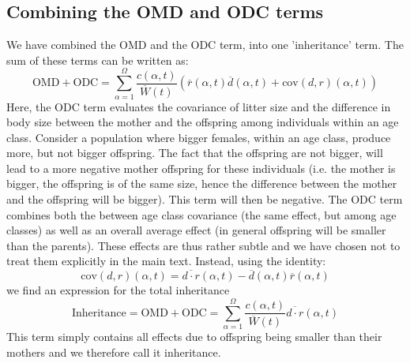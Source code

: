 \subsection{Combining the OMD and ODC terms}\label{app:ape:inh}
We have combined the OMD and the ODC term, into one 'inheritance' term. The sum of these terms can be written as:
\begin{equation}
\text{OMD} + \text{ODC} = 
\sum_{\alpha=1}^\Omega 
\frac{c(\alpha,t)}{\overline{W}(t)} 
\left(
\overline{r}(\alpha,t)\overline{d}(\alpha,t)
+ 
\mathrm{cov}(d,r)(\alpha,t) 
\right) 
\end{equation}
Here, the ODC term evaluates the covariance of litter size and the difference in body size between the mother and the offspring among individuals within an age class. Consider a population where bigger females, within an age class, produce more, but not bigger offspring. The fact that the offspring are not bigger, will lead to a more negative mother offspring for these individuals (i.e. the mother is bigger, the offspring is of the same size, hence the difference between the mother and the offspring will be bigger). This term will then be negative. The ODC term combines both the between age class covariance (the same effect, but among age classes) as well as an overall average effect (in general offspring will be smaller than the parents). These effects are thus rather subtle and we have chosen not to treat them explicitly in the main text. Instead, using the identity:
\begin{equation}
\mathrm{cov}(d,r)(\alpha,t) = \overline{d\cdot r}(\alpha,t) - \overline{d}(\alpha,t)\overline{r}(\alpha,t)
\end{equation}
we find an expression for the total inheritance
\begin{equation}
\text{Inheritance} =
\text{OMD} + \text{ODC} = 
\sum_{\alpha=1}^\Omega 
\frac{c(\alpha,t)}{\overline{W}(t)} 
\overline{d\cdot r}(\alpha,t)
\end{equation}
This term simply contains all effects due to offspring being smaller than their mothers and we therefore call it inheritance.

